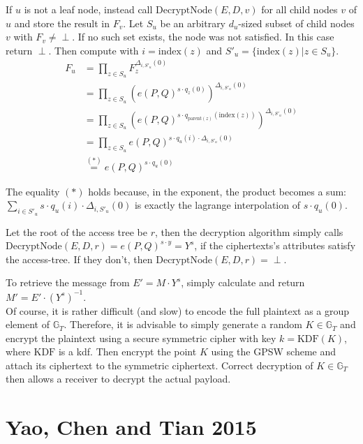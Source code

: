 If $u$ is not a leaf node, instead call $\text{DecryptNode}(E, D, v)$ for all child nodes $v$ of $u$ and store the result in $F_v$.
Let $S_u$ be an arbitrary $d_u$-sized subset of child nodes $v$ with $F_v \neq \perp$. If no such set exists, the node was not satisfied. In this case return $\perp$.
Then compute with $i = \text{index}(z)$ and $S'_u = \{\text{index}(z) | z \in S_u\}$.
\begin{equation}
    \begin{split}
        F_u &= \prod_{z \in S_u} F_z^{\Delta_{i,S'_u}(0)}\\
        &= \prod_{z \in S_u} (e(P,Q)^{s\cdot q_z(0)})^{\Delta_{i,S'_u}(0)}\\
        &= \prod_{z \in S_u} (e(P,Q)^{s\cdot q_{\text{parent}(z)}(\text{index}(z))})^{\Delta_{i,S'_u}(0)}\\
        &= \prod_{z \in S_u} e(P,Q)^{s\cdot q_u(i) \cdot \Delta_{i,S'_u}(0)}\\
        &\stackrel{(*)}{=} e(P,Q)^{s \cdot q_u(0)}
    \end{split}
\end{equation}

The equality $(*)$ holds because, in the exponent, the product becomes a sum: $\sum_{i\in S'_u} s \cdot q_u(i) \cdot \Delta_{i,S'_u}(0)$ is exactly the lagrange interpolation of $s \cdot q_u(0)$.

Let the root of the access tree be $r$, then the decryption algorithm simply calls $\text{DecryptNode}(E, D, r) = e(P,Q)^{s \cdot y} = Y^s$, if the ciphertexts's attributes satisfy the \gls{access-tree}.
If they don't, then $\text{DecryptNode}(E, D, r) = \perp$.

To retrieve the message from $E' = M \cdot Y^s$, simply calculate and return $M' = E' \cdot (Y^s)^{-1}$.\\

Of course, it is rather difficult (and slow) to encode the full plaintext as a group element of $\mathbb{G}_T$.
Therefore, it is advisable to simply generate a random $K \in \mathbb{G}_T$ and encrypt the plaintext using a secure symmetric cipher with key $k = \text{KDF}(K)$, where $\text{KDF}$ is a \gls{kdf}.
Then encrypt the point $K$ using the GPSW scheme and attach its ciphertext to the symmetric ciphertext.
Correct decryption of $K \in \mathbb{G}_T$ then allows a receiver to decrypt the actual payload.

\section{Yao, Chen and Tian 2015}

